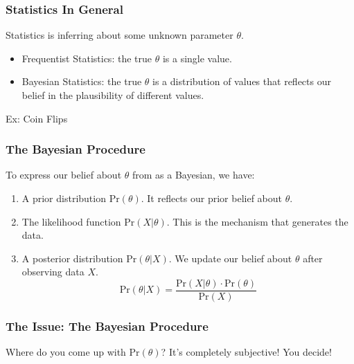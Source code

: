 \documentclass[handout]{beamer}
\newcommand{\blue}[1]{\textcolor{blue2}{#1}}
\newcommand{\prob}{\mbox{Pr}}
\begin{document}
\begin{frame}[fragile]
\frametitle{Statistics In General}
Statistics is inferring about some unknown parameter $\theta$.

\begin{itemize}
\pause\item \blue{Frequentist Statistics}:  the true $\theta$ is a single value.
\pause\item \blue{Bayesian Statistics}:  the true $\theta$ is a \blue{distribution} of values that reflects our \blue{belief} in the plausibility of different values.
\end{itemize}
 
\pause Ex: Coin Flips

\end{frame}


\begin{frame}
\frametitle{The Bayesian Procedure}
To express our belief about $\theta$ from as a Bayesian, we have:
\begin{enumerate}
\pause\item A prior distribution $\prob(\theta)$.  It reflects our \blue{prior} belief about $\theta$.
\pause\item The likelihood function $\prob(X | \theta)$.  This is the mechanism that generates the \blue{data}.
\pause\item A posterior distribution $\prob(\theta | X)$.  We \blue{update} our belief about $\theta$ after observing data $X$.
\[
\prob(\theta | X) = \frac{\prob(X | \theta) \cdot \prob(\theta)}{\prob(X)}
\]
\end{enumerate}
\end{frame}


\begin{frame}
\frametitle{The Issue:  The Bayesian Procedure}

Where do you come up with $\prob(\theta)$?  It's completely \blue{subjective}!  You decide!

\end{frame}
\end{document}
